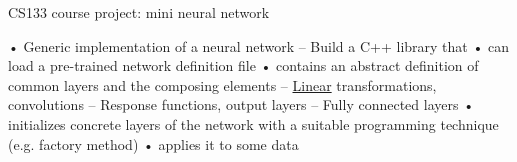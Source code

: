 C\+S133 course project\+: mini neural network

• Generic implementation of a neural network – Build a C++ library that • can load a pre-\/trained network definition file • contains an abstract definition of common layers and the composing elements – \mbox{\hyperlink{class_linear}{Linear}} transformations, convolutions – Response functions, output layers – Fully connected layers • initializes concrete layers of the network with a suitable programming technique (e.\+g. factory method) • applies it to some data 